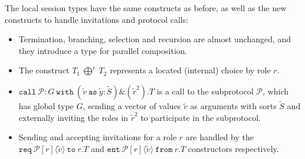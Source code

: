 \documentclass[12pt,twoside]{report}
\begin{document}
The local session types have the same constructs as before, as well as the new constructs to handle invitations and protocol calls:
\begin{itemize}
    \item Termination, branching, selection and recursion are almost unchanged, and they introduce a type for parallel composition. 
    \item The construct $T_1\ \bigoplus^r\ T_2$ represents a located (internal) choice by role $r$.
    \item $\texttt{call}\ \mathcal{P}:G\ \texttt{with}\ (\widetilde{v}\ \texttt{as}\ \widetilde{y}:\widetilde{S})\&(\widetilde{r}^2).T$ is a call to the subprotocol $\mathcal{P}$, which has global type $G$, sending a vector of values $\widetilde{v}$ as arguments with sorts $\widetilde{S}$ and externally inviting the roles in $\widetilde{r}^2$ to participate in the subprotocol.
    \item Sending and accepting invitations for a role $r$ are handled by the $\texttt{req}\ \mathcal{P}[r]\langle \widetilde{v} \rangle\ \texttt{to}\ r.T$ and $\texttt{ent}\ \mathcal{P}[r]\langle \widetilde{v} \rangle\ \texttt{from}\ r.T$ constructors respectively.
\end{itemize}{}
\end{document}
